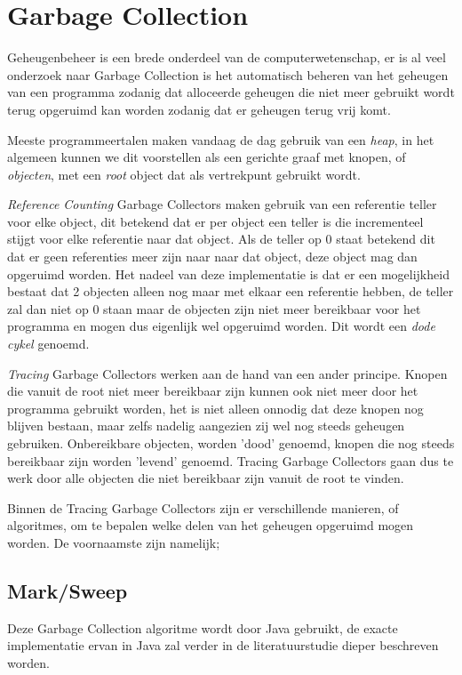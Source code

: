 \section{Garbage Collection}
\label{sec:Garbage collection}
Geheugenbeheer is een brede onderdeel van de computerwetenschap, er is al veel onderzoek naar
Garbage Collection is het automatisch beheren van het geheugen van een programma zodanig dat alloceerde geheugen die niet meer gebruikt wordt terug opgeruimd kan worden zodanig dat er geheugen terug vrij komt.

Meeste programmeertalen maken vandaag de dag gebruik van een \textit{heap}, in het algemeen kunnen we dit voorstellen als een gerichte graaf met knopen, of \textit{objecten}, met een \textit{root} object dat als vertrekpunt gebruikt wordt.

\textit{Reference Counting} Garbage Collectors maken gebruik van een referentie teller voor elke object, dit betekend dat er per object een teller is die incrementeel stijgt voor elke referentie naar dat object.
Als de teller op 0 staat betekend dit dat er geen referenties meer zijn naar naar dat object, deze object mag dan  opgeruimd worden.
Het nadeel van deze implementatie is dat er een mogelijkheid bestaat dat 2 objecten alleen nog maar met elkaar een referentie hebben, de teller zal dan niet op 0 staan maar de objecten zijn niet meer bereikbaar voor het programma en mogen dus eigenlijk wel opgeruimd worden.
Dit wordt een \textit{dode cykel} genoemd.\autocite{VanderCruysse2019}

\textit{Tracing} Garbage Collectors werken aan de hand van een ander principe.
Knopen die vanuit de root niet meer bereikbaar zijn kunnen ook niet meer door het programma gebruikt worden, het is niet alleen onnodig dat deze knopen nog blijven bestaan, maar zelfs nadelig aangezien zij wel nog steeds geheugen gebruiken.
Onbereikbare objecten, worden 'dood' genoemd, knopen die nog steeds bereikbaar zijn worden 'levend' genoemd.
Tracing Garbage Collectors gaan dus te werk door alle objecten die niet bereikbaar zijn vanuit de root te vinden. 

Binnen de Tracing Garbage Collectors zijn er verschillende manieren, of algoritmes, om te bepalen welke delen van het geheugen opgeruimd mogen worden.
De voornaamste zijn namelijk;
    \subsection{Mark/Sweep}
    
    
    Deze Garbage Collection algoritme wordt door Java gebruikt, de exacte implementatie ervan in Java zal verder in de literatuurstudie dieper beschreven worden.
    
